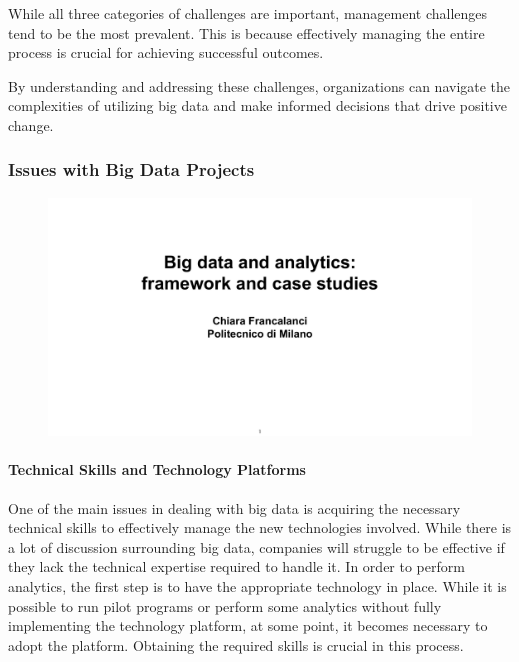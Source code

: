 While all three categories of challenges are important, management
challenges tend to be the most prevalent. This is because effectively
managing the entire process is crucial for achieving successful
outcomes.

By understanding and addressing these challenges, organizations can
navigate the complexities of utilizing big data and make informed
decisions that drive positive change.

\subsubsection{Issues with Big Data Projects}

\begin{figure}[!h]
  \centering
  \includegraphics[page=40, trim = 0cm 3.5cm 1.5cm 4.5cm, clip, width=\imagewidth]{images/06 - BIG_DATA.pdf}
\end{figure}

\paragraph{Technical Skills and Technology Platforms}

One of the main issues in dealing with big data is acquiring the
necessary technical skills to effectively manage the new technologies
involved. While there is a lot of discussion surrounding big data,
companies will struggle to be effective if they lack the technical
expertise required to handle it. In order to perform analytics, the
first step is to have the appropriate technology in place. While it is
possible to run pilot programs or perform some analytics without fully
implementing the technology platform, at some point, it becomes
necessary to adopt the platform. Obtaining the required skills is
crucial in this process.

